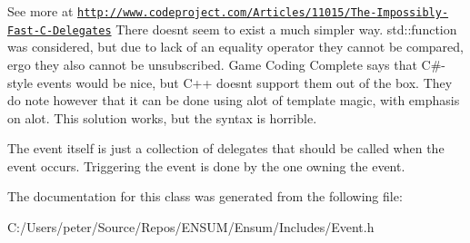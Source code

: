 See more at \href{http://www.codeproject.com/Articles/11015/The-Impossibly-Fast-C-Delegates}{\tt http\+://www.\+codeproject.\+com/\+Articles/11015/\+The-\/\+Impossibly-\/\+Fast-\/\+C-\/\+Delegates} There doesn\textquotesingle{}t seem to exist a much simpler way. std\+::function was considered, but due to lack of an equality operator they cannot be compared, ergo they also cannot be unsubscribed. Game Coding Complete says that C\#-\/style events would be nice, but C++ doesn\textquotesingle{}t support them out of the box. They do note however that it can be done using alot of template magic, with emphasis on alot. This solution works, but the syntax is horrible.

The event itself is just a collection of delegates that should be called when the event occurs. Triggering the event is done by the one owning the event. 

The documentation for this class was generated from the following file\+:\begin{DoxyCompactItemize}
\item 
C\+:/\+Users/peter/\+Source/\+Repos/\+E\+N\+S\+U\+M/\+Ensum/\+Includes/Event.\+h\end{DoxyCompactItemize}
